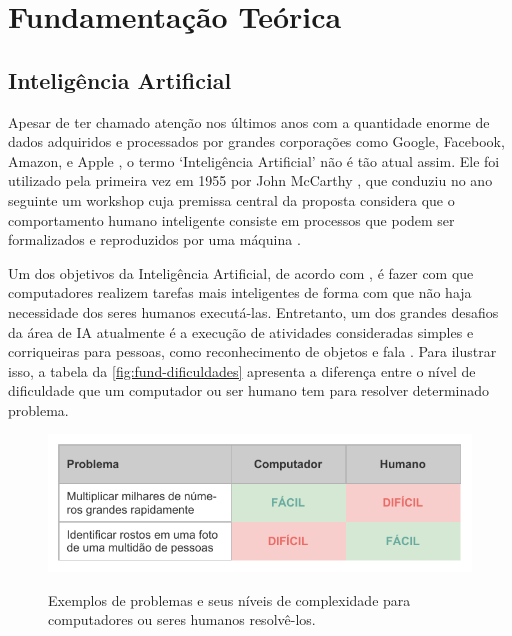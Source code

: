 \chapter{Fundamentação Teórica} \label{cap:fund}

\section{Inteligência Artificial} \label{cap:fund-ia}

Apesar de ter chamado atenção nos últimos anos com a quantidade enorme de dados adquiridos e processados por grandes corporações como Google, Facebook, Amazon, e Apple \cite{ref:Lawless-Mittu-Sofge}, o termo `Inteligência Artificial' não é tão atual assim. Ele foi utilizado pela primeira vez em 1955 por John McCarthy \cite{ref:Cohen}, que conduziu no ano seguinte um workshop cuja premissa central da proposta considera que o comportamento humano inteligente consiste em processos que podem ser formalizados e reproduzidos por uma máquina \cite{ref:Harvard-AI}. %

Um dos objetivos da Inteligência Artificial, de acordo com , é fazer com que computadores realizem tarefas mais inteligentes de forma com que não haja necessidade dos seres humanos executá-las. Entretanto, um dos grandes desafios da área de IA atualmente é a execução de atividades consideradas simples e corriqueiras para pessoas, como reconhecimento de objetos e fala \cite{ref:Goodfellow-Bengio-Courville}. Para ilustrar isso, a tabela da \autoref{fig:fund-dificuldades} apresenta a diferença entre o nível de dificuldade que um computador ou ser humano tem para resolver determinado problema.

\begin{figure}[h!] %
  \centering
  \caption{Exemplos de problemas e seus níveis de complexidade para computadores ou seres humanos resolvê-los.}
  \includegraphics[scale=1.1]{img/img-fundamentacao-dificuldades.pdf}
  \label{fig:fund-dificuldades}
\end{figure}

